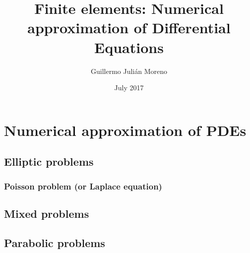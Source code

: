 \documentclass[palatino,twoside]{epflnotes}
\title{Finite elements: Numerical approximation of Differential Equations}
\author{Guillermo Julián Moreno}
\date{July 2017}
\newif\ifincludefirstsemester
\begin{document}
\frontmatter
\pagestyle{plain}
\maketitle

\tableofcontents
\mainmatter

\ifincludefirstsemester
\part{Prelude: Fundamentals on analysis}


\part{Theory of finite elements}


\part{Numerical approximation of ODEs}

\fi

\part{Numerical approximation of PDEs}

\chapter{Elliptic problems}

\section{Poisson problem (or Laplace equation)}
\ifincludefirstsemester\fi


\ifincludefirstsemester\fi


\chapter{Mixed problems}
\ifincludefirstsemester\fi


\chapter{Parabolic problems}

\end{document}
